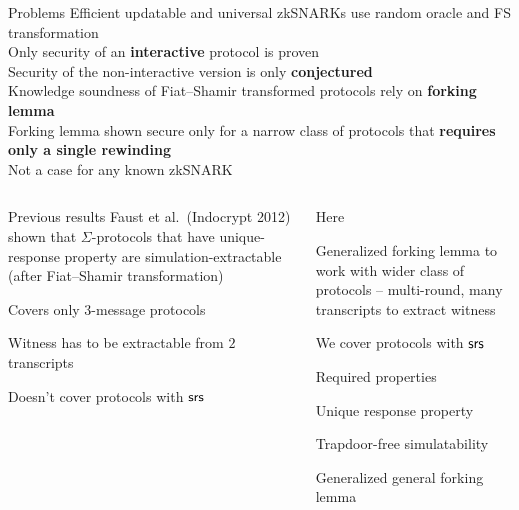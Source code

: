 \documentclass[aspectratio=169]{beamer}
\renewcommand{\emph}[1]{\textbf{#1}}
\begin{document}
\begin{frame}
  \begin{block}{Problems}
    Efficient updatable and universal zkSNARKs use random oracle and FS
    transformation\\
    Only security of an \emph{interactive} protocol is proven\\
    Security of the non-interactive version is only \emph{conjectured}\\
    Knowledge soundness of Fiat--Shamir transformed protocols rely on \emph{forking lemma}\\
    Forking lemma shown secure only for a narrow class of protocols that
    \emph{requires only a single rewinding}\\
    Not a case for any known zkSNARK
  \end{block}
  \pause
  \vspace*{-0.5cm}
  \begin{columns}[t]
    \begin{column}{0.52\linewidth}
      \begin{block}{Previous results}
        Faust et al.~(Indocrypt 2012) shown that $\Sigma$-protocols that have
        unique-response property are simulation-extractable (after Fiat--Shamir
        transformation)
        \begin{compactitem}
        \item Covers only $3$-message protocols
        \item Witness has to be extractable from $2$ transcripts
        \item Doesn't cover protocols with $\mathsf{srs}$
        \end{compactitem}
      \end{block}
      \pause
    \end{column}
    \begin{column}{0.4\linewidth}
      \begin{block}{Here}
        \begin{compactitem}
        \item Generalized forking lemma to work with wider class
          of protocols -- multi-round, many transcripts to extract witness
        \item We cover protocols with $\mathsf{srs}$
        \end{compactitem}
      \end{block}\pause
      \begin{block}{Required properties}
        \begin{compactitem}
          \item Unique response property
          \item Trapdoor-free simulatability
          \item Generalized general forking lemma
          \end{compactitem}
        \end{block}
    \end{column}
  \end{columns}
\end{frame}
\end{document}
